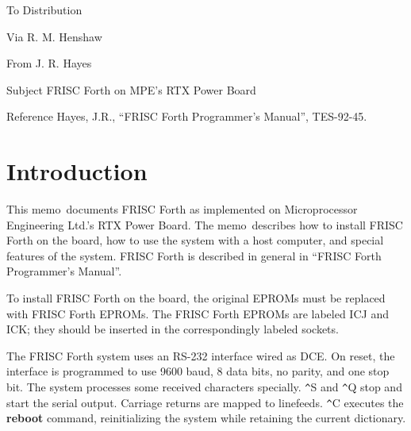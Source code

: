 \raggedbottom
\textwidth 6.5in
\oddsidemargin 0.0in
\evensidemargin 0.0in
\topmargin 0.0in
\textheight 9.0in

\pagestyle{fancy}
\newcommand{\memonum}{S1I-94-Draft}
\newcommand{\issuedate}{June 27, 1994}
\lhead{}
\chead{}
\rhead{\memonum\\\ifnum\value{page}=1\issuedate\else Page \thepage\fi}
\lfoot{}
\cfoot{}
\rfoot{}
\addtolength{\headheight}{12pt}

\newcommand{\memoaddrlabel}[1]{\mbox{\bf #1:}\hfil}
\newenvironment{memoaddress}{%
\begin{list}{}
	{
		\let\makelabel\memoaddrlabel
		\setlength{\labelwidth}{1in}
		\setlength{\leftmargin}{1in}
		\setlength{\labelsep}{0in}
		\setlength{\itemsep}{0in}
	}
}{%
\end{list}}

\newcommand{\doctype}{memo}			%


\begin{memoaddress}
	\item[To] Distribution
	\item[Via] R. M. Henshaw
	\item[From] J. R. Hayes
	\item[Subject] FRISC Forth on MPE's RTX Power Board
	\item[Reference] Hayes, J.R., ``FRISC Forth Programmer's
		Manual'', TES-92-45.
\end{memoaddress}

\newcommand{\fw}[1]{{\bf #1}}			%
\newcommand{\num}[1]{{\em #1}}			%

\section{Introduction}
This \doctype\ documents FRISC Forth as implemented on Microprocessor
Engineering Ltd.'s RTX Power Board.
The \doctype\ describes how to install FRISC Forth on the board,
how to use the system with a host computer, and
special features of the system.
FRISC Forth is described in general in ``FRISC Forth Programmer's
Manual''.

To install FRISC Forth on the board, the original EPROMs
must be replaced with FRISC Forth EPROMs.  The FRISC Forth EPROMs
are labeled ICJ and ICK; they should be inserted in the correspondingly
labeled sockets.

The FRISC Forth system uses an RS-232 interface wired as DCE.
On reset, the interface is programmed to use 9600 baud, 8 data bits,
no parity, and one stop bit.  The system processes some received
characters specially.  \verb|^|S and \verb|^|Q stop and start the
serial output.  Carriage returns are mapped to linefeeds.
\verb|^|C executes the \fw{reboot} command, reinitializing the system
while retaining the current dictionary.


